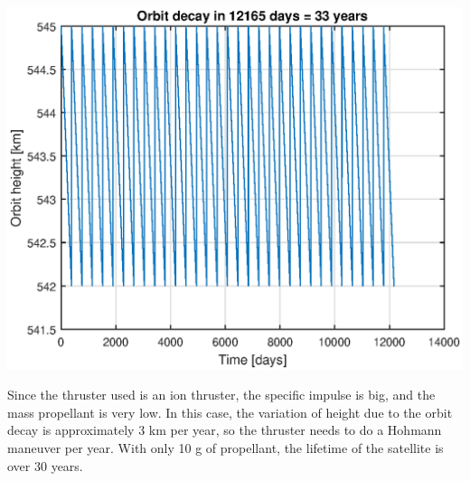 \begin{minipage}{\textwidth}
\begin{minipage}[b]{0.49\textwidth}
\centering
\includegraphics[scale=0.4]{ThrustersDrag/thrust3km.eps}
\label{fig:hohmann3km}
\end{minipage}
\hfill
{}
\end{minipage}

Since the thruster used is an ion thruster, the specific impulse is big, and the mass propellant is very low. In this case, the variation of height due to the orbit decay is approximately 3 km per year, so the thruster needs to do a Hohmann maneuver per year. With only 10 g of propellant, the lifetime of the satellite is over 30 years.

